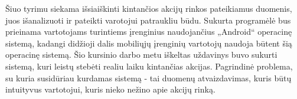 Šiuo tyrimu siekama išsiaiškinti kintančios akcijų rinkos pateikiamus duomenis, juos išanalizuoti ir pateikti varotojui patraukliu būdu. Sukurta programėlė bus prieinama vartotojams turintiems įrenginius naudojančius „Android“ operacinę sistemą, kadangi didžioji dalis mobiliųjų įrenginių vartotojų naudoja būtent šią operacinę sistemą. Šio kursinio darbo metu iškeltas uždavinys buvo sukurti sistemą, kuri leistų stebėti realiu laiku kintančias akcijas. Pagrindinė problema, su kuria susidūriau kurdamas sistemą - tai duomenų atvaizdavimas, kuris būtų intuityvus vartotojui, kuris nieko nežino apie akcijų rinką.